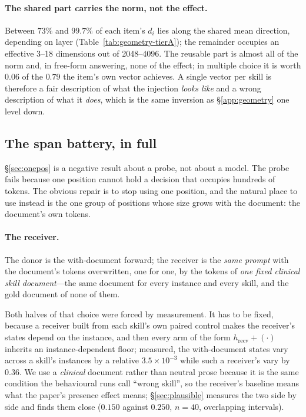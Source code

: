\documentclass{article}
\newcommand{\dvec}{\ensuremath{d}}
\begin{document}
\paragraph{The shared part carries the norm, not the effect.} Between $73\%$ and $99.7\%$ of each item's
$\dvec_i$ lies along the shared mean direction, depending on layer
(Table~\ref{tab:geometry-tierA}); the remainder occupies an effective 3--18 dimensions
out of 2048--4096. The reusable part is almost all of the norm and, in free-form
answering, none of the effect; in multiple choice it is worth $0.06$ of the
$0.79$ the item's own vector achieves. A single vector per skill is therefore a
fair description of
what the injection \emph{looks like} and a wrong description of what it
\emph{does}, which is the same inversion as \S\ref{app:geometry} one level
down.




\subsection{The span battery, in full}
\label{app:battery}

\S\ref{sec:onepos} is a negative result about a probe, not about a model. The
probe fails because one position cannot hold a decision that occupies hundreds
of tokens. The obvious repair is to stop using one position, and the natural
place to use instead is the one group of positions whose size grows with the
document: the document's own tokens.

\paragraph{The receiver.} The donor is the with-document forward; the receiver
is the \emph{same prompt} with the document's tokens overwritten, one for one,
by the tokens of \emph{one fixed clinical skill document}---the same document
for every instance and every skill, and the gold document of none of them.

Both halves of that choice were forced by measurement. It has to be fixed,
because a receiver built from each skill's own paired control makes the
receiver's states depend on the instance, and then every arm of the form
$h_{\text{recv}} + (\cdot)$ inherits an instance-dependent floor; measured, the
with-document states vary across a skill's instances by a relative
$3.5\times10^{-3}$ while such a receiver's vary by $0.36$. We use a
\emph{clinical} document rather than neutral prose because it is the same
condition the behavioural runs call
``wrong skill'', so the receiver's baseline means what the paper's presence
effect means; \S\ref{sec:plausible} measures the two side by side and finds them
close ($0.150$ against $0.250$, $n=40$, overlapping intervals).
\end{document}
